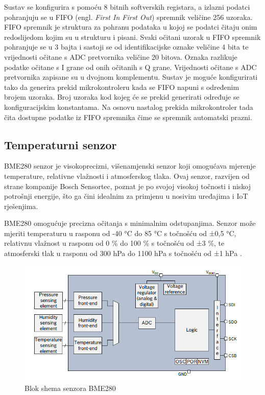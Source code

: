 \documentclass[../diplomski_rad.tex]{subfiles}
\begin{document}
Sustav se konfigurira s pomoću 8 bitnih softverskih registara, a izlazni podatci pohranjuju se u 
FIFO (engl. \textit{First In First Out}) spremnik veličine 256 uzoraka.
FIFO spremnik je struktura za pohranu podataka u kojoj se podatci čitaju onim redoslijedom kojim su u strukturu i pisani. 
Svaki očitani uzorak u FIFO spremnik pohranjuje se u 3 bajta i sastoji se od identifikacijske oznake veličine 4 bita te vrijednosti očitane s ADC 
pretvornika veličine 20 bitova. 
Oznaka razlikuje podatke očitane s I grane od onih očitanih s Q grane.
Vrijednosti očitane s ADC pretvornika zapisane su u dvojnom komplementu. 
Sustav je moguće konfigurirati tako da generira prekid mikrokontroleru kada se FIFO napuni s određenim brojem uzoraka. 
Broj uzoraka kod kojeg će se prekid generirati određuje se konfiguracijskim konstantama. Na osnovu nastalog prekida 
mikrokontroler tada čita dostupne podatke iz FIFO spremnika čime se spremnik automatski prazni.  

\subsection{Temperaturni senzor}

BME280 senzor je visokoprecizni, višenamjenski senzor koji omogućava mjerenje temperature, 
relativne vlažnosti i atmosferskog tlaka. 
Ovaj senzor, razvijen od strane kompanije Bosch Sensortec, poznat je po svojoj visokoj točnosti i 
niskoj potrošnji energije, što ga čini idealnim za primjenu u nosivim uređajima i IoT rješenjima.

BME280 omogućuje precizna očitanja s minimalnim odstupanjima. 
Senzor može mjeriti temperaturu u rasponu od -40 °C do 85 °C s točnošću od ±0,5 °C, 
relativnu vlažnost u rasponu od 0 \% do 100 \% s točnošću od ±3 \%, te atmosferski tlak u 
rasponu od 300 hPa do 1100 hPa s točnošću od ±1 hPa \cite{bme280_datasheet}.

\begin{figure}[htb]
    \centering
    \includegraphics[width=1\textwidth]{Figures/bme280.png} 
    \caption{Blok shema senzora BME280\cite{bme280_datasheet}}
    \label{slk:shema_bme280}
\end{figure}
\end{document}
